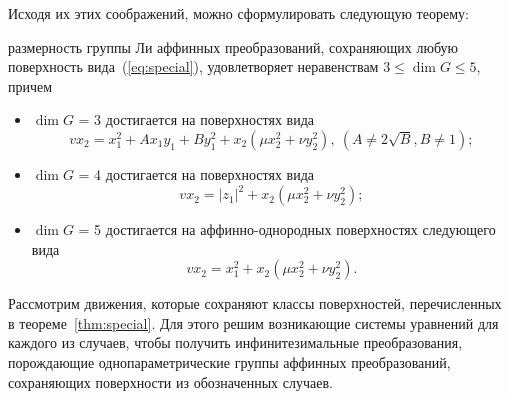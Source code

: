 \documentclass[../main.tex]{subfiles}
\begin{document}
Исходя их этих соображений, можно сформулировать следующую теорему:
\begin{theorem}\label{thm:special} размерность группы Ли аффинных преобразований, сохраняющих любую поверхность вида~(\ref{eq:special}), удовлетворяет неравенствам
$3 \le \dim G \le 5$, причем
\begin{itemize}
	\item $\dim G$ = 3 достигается на поверхностях вида
	\begin{equation}\label{eq:special_3}
		v x_2 = x_1^2 + A x_1 y_1 + B y_1^2 + x_2 (\mu x_2^2 + \nu y_2^2),~(A \ne 2\sqrt{B}, B \ne 1);
	\end{equation}
	\item $\dim G$ = 4 достигается на поверхностях вида
	\begin{equation}\label{eq:special_4}
		v x_2 = |z_1|^2 + x_2 (\mu x_2^2 + \nu y_2^2);
	\end{equation}
		\item $\dim G$ = 5 достигается на аффинно-однородных поверхностях следующего вида
	\begin{equation}\label{eq:special_5}
		v x_2 = x_1^2 + x_2 (\mu x_2^2 + \nu y_2^2).
	\end{equation}
\end{itemize}
\end{theorem}

Рассмотрим движения, которые сохраняют классы поверхностей, перечисленных в теореме~\ref{thm:special}. Для этого решим возникающие системы уравнений для каждого из случаев, чтобы получить инфинитезимальные преобразования, порождающие однопараметрические группы аффинных преобразований, сохраняющих поверхности из обозначенных случаев.
\end{document}
